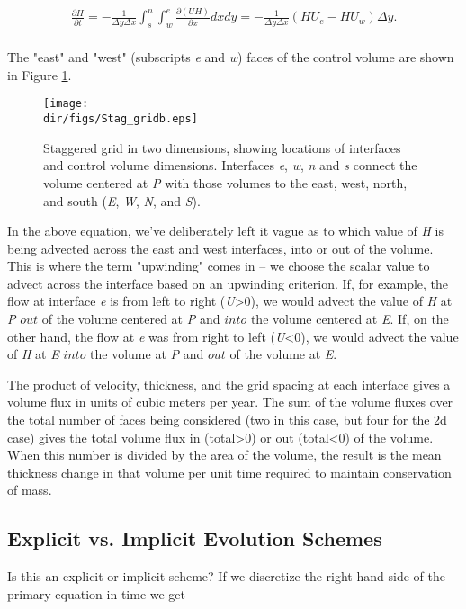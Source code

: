\begin{align*}
\frac{\partial H}{\partial t}=-\frac{1}{\Delta y\Delta x}\int_{s}^{n}{\int_{w}^{e}{\frac{\partial \left( UH \right)}{\partial x}}}dxdy=-\frac{1}{\Delta y\Delta x}\left( HU_{e}-HU_{w} \right)\Delta y. \\
\end{align*}

The "east" and "west" (subscripts \textit{e} and \textit{w}) faces of the control volume are shown in Figure \ref{fig:stag_c_grid2}.

\begin{figure}
  \begin{center}
    \texttt{[image: \\dir/figs/Stag\_gridb.eps]}
  \end{center}
  \caption{Staggered grid in two dimensions, showing locations of interfaces and control volume dimensions. Interfaces \textit{e}, \textit{w}, \textit{n} and \textit{s} connect the volume centered at \textit{P} with those volumes to the east, west, north, and south (\textit{E}, \textit{W}, \textit{N}, and \textit{S}).}
  \label{fig:stag_c_grid2}
\end{figure} 

In the above equation, we've deliberately left it vague as to which value of \textit{H} is being advected across the east and west interfaces, into or out of the volume. This is where the term "upwinding" comes in -- we choose the scalar value to advect across the interface based on an upwinding criterion. If, for example, the flow at interface \textit{e} is from left to right (\textit{U}>0), we would advect the value of \textit{H} at \textit{P} $out$ of the volume centered at \textit{P} and $into$ the volume centered at \textit{E}. If, on the other hand, the flow at \textit{e} was from right to left (\textit{U}<0), we would advect the value of \textit{H} at \textit{E} $into$ the volume at \textit{P} and $out$ of the volume at \textit{E}. 

The product of velocity, thickness, and the grid spacing at each interface gives a volume flux in units of cubic meters per year. The sum of the volume fluxes over the total number of faces being considered (two in this case, but four for the 2d case) gives the total volume flux in (total>0) or out (total<0) of the volume. When this number is divided by the area of the volume, the result is the mean thickness change in that volume per unit time required to maintain conservation of mass.

\subsection{Explicit vs. Implicit Evolution Schemes}
Is this an explicit or implicit scheme? If we discretize the right-hand side of the primary equation in time we get

